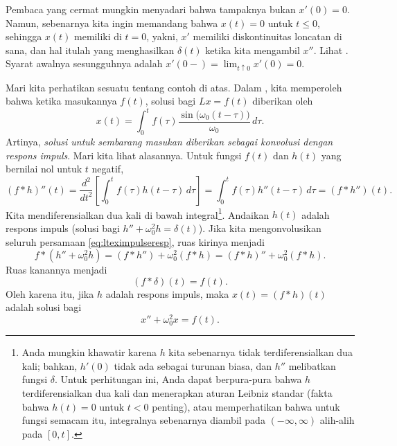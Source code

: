 \begin{remark}
Pembaca yang cermat mungkin menyadari bahwa tampaknya bukan $x'(0)=0$.
Namun, sebenarnya kita ingin memandang bahwa $x(t)=0$ untuk $t \leq 0$, sehingga $x(t)$
memiliki  di $t=0$, yakni,
$x'$ memiliki diskontinuitas loncatan di sana,
dan hal itulah yang menghasilkan $\delta(t)$ ketika kita mengambil $x''$.
Lihat .
Syarat awalnya sesungguhnya adalah $x'(0-) = \lim_{t \uparrow 0} x'(0) = 0$.
\end{remark}

Mari kita perhatikan sesuatu tentang contoh di atas. 
Dalam ,
kita memperoleh bahwa
ketika masukannya $f(t)$, solusi bagi $Lx = f(t)$
diberikan oleh
\begin{equation*}
x(t) = 
\int_0^t
f(\tau) 
\frac{\sin \bigl( \omega_0 (t-\tau) \bigr)}{\omega_0} \, d\tau .
\end{equation*}
Artinya, \emph{solusi untuk sembarang masukan diberikan sebagai
konvolusi dengan respons impuls}.  Mari kita lihat alasannya.
Untuk fungsi $f(t)$ dan $h(t)$ yang bernilai nol untuk $t$ negatif,
\begin{equation*}
(f * h)''(t) =
\frac{d^2}{dt^2}\left[
\int_0^t
f(\tau) 
h(t-\tau) \, d\tau \right]
=
\int_0^t
f(\tau) 
h''(t-\tau) \, d\tau
= (f * h'')(t) .
\end{equation*}
Kita mendiferensialkan dua kali di bawah
integral\footnote{%
Anda mungkin khawatir karena $h$ kita
sebenarnya tidak terdiferensialkan dua kali; bahkan, $h'(0)$
tidak ada sebagai turunan biasa, dan $h''$ melibatkan
fungsi $\delta$.
Untuk perhitungan ini, Anda dapat berpura-pura bahwa $h$ terdiferensialkan dua kali
dan menerapkan aturan Leibniz standar
(fakta bahwa $h(t)=0$ untuk $t < 0$ penting), atau
memperhatikan bahwa untuk fungsi semacam itu,
integralnya sebenarnya diambil pada
$(-\infty,\infty)$ alih-alih pada $[0,t]$.}.
Andaikan $h(t)$ adalah respons impuls (solusi bagi $h''+\omega_0^2 h = \delta(t)$).
Jika kita mengonvolusikan seluruh persamaan \eqref{eq:lteximpulseresp},
ruas kirinya menjadi
\begin{equation*}
f * (h'' + \omega_0^2 h) =
(f * h'') + \omega_0^2 (f * h) =
(f * h)'' + \omega_0^2 (f * h) .
\end{equation*}
Ruas kanannya menjadi
\begin{equation*}
(f * \delta)(t) = f(t).
\end{equation*}
Oleh karena itu, jika $h$ adalah respons impuls,
maka $x(t) = (f * h)(t)$ adalah solusi bagi
\begin{equation*}
x'' + \omega_0^2 x = f(t) .
\end{equation*}

